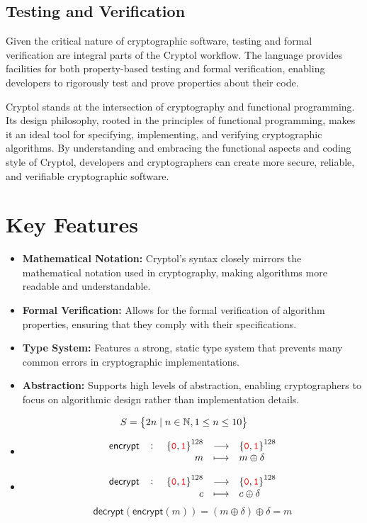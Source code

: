 \subsection*{Testing and Verification}
Given the critical nature of cryptographic software, testing and formal verification are integral parts of the Cryptol workflow. The language provides facilities for both property-based testing and formal verification, enabling developers to rigorously test and prove properties about their code.


Cryptol stands at the intersection of cryptography and functional programming. Its design philosophy, rooted in the principles of functional programming, makes it an ideal tool for specifying, implementing, and verifying cryptographic algorithms. By understanding and embracing the functional aspects and coding style of Cryptol, developers and cryptographers can create more secure, reliable, and verifiable cryptographic software.

\section*{Key Features}
\begin{itemize}
	\item \textbf{Mathematical Notation:} Cryptol's syntax closely mirrors the mathematical notation used in cryptography, making algorithms more readable and understandable.
	\item \textbf{Formal Verification:} Allows for the formal verification of algorithm properties, ensuring that they comply with their specifications.
	\item \textbf{Type System:} Features a strong, static type system that prevents many common errors in cryptographic implementations.
	\item \textbf{Abstraction:} Supports high levels of abstraction, enabling cryptographers to focus on algorithmic design rather than implementation details.
\end{itemize}
\[
S=\set{2n\mid n\in\mathbb{N}, 1\leq n\leq 10}
\]
\begin{itemize}
	\item \[
	\fullfunction{\mathsf{encrypt}}{\binaryfield^{128}}{\binaryfield^{128}}{m}{m\oplus\delta}
	\]
	\item \[
	\fullfunction{\mathsf{decrypt}}{\binaryfield^{128}}{\binaryfield^{128}}{c}{c\oplus\delta}
	\]\[
	\mathsf{decrypt}(\mathsf{encrypt}(m))=(m\oplus\delta)\oplus\delta=m
	\]
\end{itemize}

